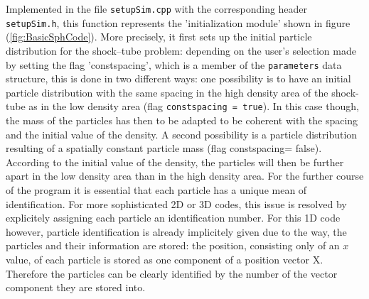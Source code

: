 \documentclass{report}
\begin{document}
Implemented in the file {\tt setupSim.cpp} with the corresponding header {\tt setupSim.h}, this function represents the 'initialization module' shown in figure (\ref{fig:BasicSphCode}). More precisely, it first sets up the initial particle distribution for the shock--tube problem: depending on the user's selection made by setting the flag 'constspacing', which is a member of the {\tt parameters} data structure, this is done in two different ways:
one possibility is to have an initial particle distribution with the same spacing in the high density area of the shock-tube as in the low density area (flag {\tt constspacing = true}). In this case though, the mass of the particles has then to be adapted to be coherent with the spacing and the initial value of the density.
A second possibility is a particle distribution resulting of a spatially constant particle mass (flag constspacing= false). According to the initial value of the density, the particles will then be further apart in the low density area than in the high density area.
For the further course of the program it is essential that each particle has a unique mean of identification. For more sophisticated 2D or 3D codes, this issue is resolved by explicitely assigning each particle an identification number. For this 1D code however, particle identification is already implicitely given due to the way, the particles and their information are stored: the position, consisting only of an $x$ value, of each particle is stored as one component of a position vector X. Therefore the particles can be clearly identified by the number of the vector component they are stored into.
\end{document}
